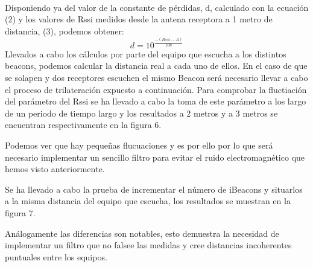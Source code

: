 \documentclass[paper=a4, fontsize=11pt,twoside]{scrartcl}	%
\begin{document}
            \paragraph{}
            Disponiendo ya del valor de la constante de pérdidas, d, calculado con la ecuación (2) y los valores
            de Rssi medidos desde la antena receptora a 1 metro de distancia, (3), podemos obtener:
            \begin{equation}
                d= 10^\frac{-(Rssi - A)}{10n}
            \end{equation}
            Llevados a cabo los cálculos por parte del equipo que escucha a los distintos beacons, podemos calcular la distancia 
            real a cada uno de ellos. En el caso de que se solapen y dos receptores escuchen el mismo Beacon será necesario
            llevar a cabo el proceso de trilateración expuesto a continuación.
            Para comprobar la fluctiación del parámetro del Rssi se ha llevado a cabo la toma de este parámetro a los largo de un 
            periodo de tiempo largo y los resultados a 2 metros y a 3 metros se encuentran respectivamente en la figura 6. 
 
            Podemos ver que hay pequeñas flucuaciones y es por ello por lo que será necesario implementar un sencillo filtro para
            evitar el ruido electromagnético que hemos visto anteriormente.
            
            Se ha llevado a cabo la prueba de incrementar el número de iBeacons y situarlos a la misma distancia del 
            equipo que escucha, los resultados se muestran en la figura 7.
            
            Análogamente las diferencias son notables, esto demuestra la necesidad de implementar
            un filtro que no falsee las medidas y cree distancias incoherentes puntuales entre los equipos.
            
\end{document}
